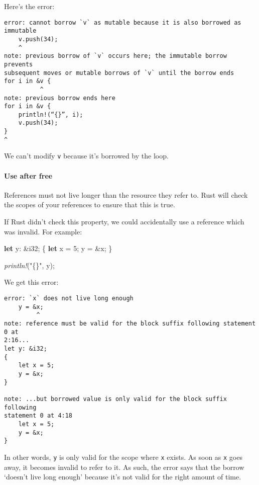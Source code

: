 \documentclass[a4paper,]{book}
\newenvironment{Shaded}{\begin{snugshade}}{\end{snugshade}}
\newcommand{\KeywordTok}[1]{\textcolor[rgb]{0.13,0.29,0.53}{\textbf{{#1}}}}
\newcommand{\DataTypeTok}[1]{\textcolor[rgb]{0.13,0.29,0.53}{{#1}}}
\newcommand{\DecValTok}[1]{\textcolor[rgb]{0.00,0.00,0.81}{{#1}}}
\newcommand{\StringTok}[1]{\textcolor[rgb]{0.31,0.60,0.02}{{#1}}}
\newcommand{\PreprocessorTok}[1]{\textcolor[rgb]{0.56,0.35,0.01}{\textit{{#1}}}}
\newcommand{\NormalTok}[1]{{#1}}
\let\oldparagraph\paragraph
\renewcommand{\paragraph}[1]{\oldparagraph{#1}\mbox{}}
\begin{document}
Here's the error:

\begin{verbatim}
error: cannot borrow `v` as mutable because it is also borrowed as immutable
    v.push(34);
    ^
note: previous borrow of `v` occurs here; the immutable borrow prevents
subsequent moves or mutable borrows of `v` until the borrow ends
for i in &v {
          ^
note: previous borrow ends here
for i in &v {
    println!(“{}”, i);
    v.push(34);
}
^
\end{verbatim}

We can't modify \texttt{v} because it's borrowed by the loop.

\paragraph{Use after free}\label{use-after-free}

References must not live longer than the resource they refer to. Rust
will check the scopes of your references to ensure that this is true.

If Rust didn't check this property, we could accidentally use a
reference which was invalid. For example:

\begin{Shaded}
\begin{Highlighting}[]
\KeywordTok{let} \NormalTok{y: &}\DataTypeTok{i32}\NormalTok{;}
\NormalTok{\{}
    \KeywordTok{let} \NormalTok{x = }\DecValTok{5}\NormalTok{;}
    \NormalTok{y = &x;}
\NormalTok{\}}

\PreprocessorTok{println!}\NormalTok{(}\StringTok{"\{\}"}\NormalTok{, y);}
\end{Highlighting}
\end{Shaded}

We get this error:

\begin{verbatim}
error: `x` does not live long enough
    y = &x;
         ^
note: reference must be valid for the block suffix following statement 0 at
2:16...
let y: &i32;
{
    let x = 5;
    y = &x;
}

note: ...but borrowed value is only valid for the block suffix following
statement 0 at 4:18
    let x = 5;
    y = &x;
}
\end{verbatim}

In other words, \texttt{y} is only valid for the scope where \texttt{x}
exists. As soon as \texttt{x} goes away, it becomes invalid to refer to
it. As such, the error says that the borrow `doesn't live long enough'
because it's not valid for the right amount of time.
\end{document}
